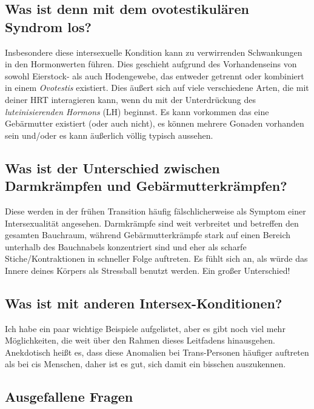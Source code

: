 \documentclass{article}
\begin{document}
\subsection{Was ist denn mit dem ovotestikulären Syndrom los?}

Insbesondere diese intersexuelle Kondition kann zu verwirrenden Schwankungen in den Hormonwerten führen. Dies geschieht aufgrund des Vorhandenseins von sowohl Eierstock- als auch Hodengewebe, das entweder getrennt oder kombiniert in einem \textit{Ovotestis} existiert. Dies äußert sich auf viele verschiedene Arten, die mit deiner HRT interagieren kann, wenn du mit der Unterdrückung des \textit{luteinisierenden Hormons} (LH) beginnst. Es kann vorkommen das eine Gebärmutter existiert (oder auch nicht), es können mehrere Gonaden vorhanden sein und/oder es kann äußerlich völlig typisch aussehen.

\subsection{Was ist der Unterschied zwischen Darmkrämpfen und Gebärmutterkrämpfen?}\label{11-35}

Diese werden in der frühen Transition häufig fälschlicherweise als Symptom einer Intersexualität angesehen. Darmkrämpfe sind weit verbreitet und betreffen den gesamten Bauchraum, während Gebärmutterkrämpfe stark auf einen Bereich unterhalb des Bauchnabels konzentriert sind und eher als scharfe Stiche/Kontraktionen in schneller Folge auftreten. Es fühlt sich an, als würde das Innere deines Körpers als Stressball benutzt werden. Ein großer Unterschied!

\subsection{Was ist mit anderen Intersex-Konditionen?}

Ich habe ein paar wichtige Beispiele aufgelistet, aber es gibt noch viel mehr Möglichkeiten, die weit über den Rahmen dieses Leitfadens hinausgehen. Anekdotisch heißt es, dass diese Anomalien bei Trans-Personen häufiger auftreten als bei cis Menschen, daher ist es gut, sich damit ein bisschen auszukennen.

\subsection*{Ausgefallene Fragen}
\end{document}
